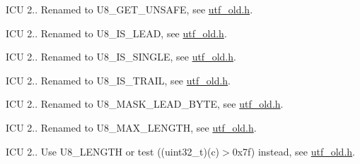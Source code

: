 \begin{DoxyRefList}
%
I\+CU 2.. Renamed to U8\+\_\+\+G\+E\+T\+\_\+\+U\+N\+S\+A\+FE, see \mbox{\hyperlink{utf__old_8h}{utf\+\_\+old.\+h}}.  
\item[Member \mbox{\hyperlink{utf__old_8h_aa8cd0f9324d04fdc22f7848a5fff516b}{U\+T\+F8\+\_\+\+I\+S\+\_\+\+L\+E\+AD}} (uchar)]\label{deprecated__deprecated000101}%
%
I\+CU 2.. Renamed to U8\+\_\+\+I\+S\+\_\+\+L\+E\+AD, see \mbox{\hyperlink{utf__old_8h}{utf\+\_\+old.\+h}}.  
\item[Member \mbox{\hyperlink{utf__old_8h_af84a5937c5449f69b0fa008fcbda46bf}{U\+T\+F8\+\_\+\+I\+S\+\_\+\+S\+I\+N\+G\+LE}} (uchar)]\label{deprecated__deprecated000100}%
%
I\+CU 2.. Renamed to U8\+\_\+\+I\+S\+\_\+\+S\+I\+N\+G\+LE, see \mbox{\hyperlink{utf__old_8h}{utf\+\_\+old.\+h}}.  
\item[Member \mbox{\hyperlink{utf__old_8h_ad349c46bd16decbfa0dd255cd26a9f76}{U\+T\+F8\+\_\+\+I\+S\+\_\+\+T\+R\+A\+IL}} (uchar)]\label{deprecated__deprecated000102}%
%
I\+CU 2.. Renamed to U8\+\_\+\+I\+S\+\_\+\+T\+R\+A\+IL, see \mbox{\hyperlink{utf__old_8h}{utf\+\_\+old.\+h}}.  
\item[Member \mbox{\hyperlink{utf__old_8h_a4185cfacf115c0ccee5ff245f21b47be}{U\+T\+F8\+\_\+\+M\+A\+S\+K\+\_\+\+L\+E\+A\+D\+\_\+\+B\+Y\+TE}} (lead\+Byte, count\+Trail\+Bytes)]\label{deprecated__deprecated000099}%
%
I\+CU 2.. Renamed to U8\+\_\+\+M\+A\+S\+K\+\_\+\+L\+E\+A\+D\+\_\+\+B\+Y\+TE, see \mbox{\hyperlink{utf__old_8h}{utf\+\_\+old.\+h}}.  
\item[Member \mbox{\hyperlink{utf__old_8h_aa8f3e2fbb14b040afe41d454e21e6d06}{U\+T\+F8\+\_\+\+M\+A\+X\+\_\+\+C\+H\+A\+R\+\_\+\+L\+E\+N\+G\+TH}} ]\label{deprecated__deprecated000105}%
%
I\+CU 2.. Renamed to U8\+\_\+\+M\+A\+X\+\_\+\+L\+E\+N\+G\+TH, see \mbox{\hyperlink{utf__old_8h}{utf\+\_\+old.\+h}}.  
\item[Member \mbox{\hyperlink{utf__old_8h_abc69ca1e115bea6c765836279a7e3da0}{U\+T\+F8\+\_\+\+N\+E\+E\+D\+\_\+\+M\+U\+L\+T\+I\+P\+L\+E\+\_\+\+U\+C\+H\+AR}} (c)]\label{deprecated__deprecated000103}%
%
I\+CU 2.. Use U8\+\_\+\+L\+E\+N\+G\+TH or test ((uint32\+\_\+t)(c)$>$0x7f) instead, see \mbox{\hyperlink{utf__old_8h}{utf\+\_\+old.\+h}}.  
\item[Member \mbox{\hyperlink{utf__old_8h_adec17410efd423546c512f92ebc839b5}{U\+T\+F8\+\_\+\+N\+E\+X\+T\+\_\+\+C\+H\+A\+R\+\_\+\+S\+A\+FE}} (s, i, length, c, strict)]\label{deprecated__deprecated000114}%

\end{DoxyRefList}
